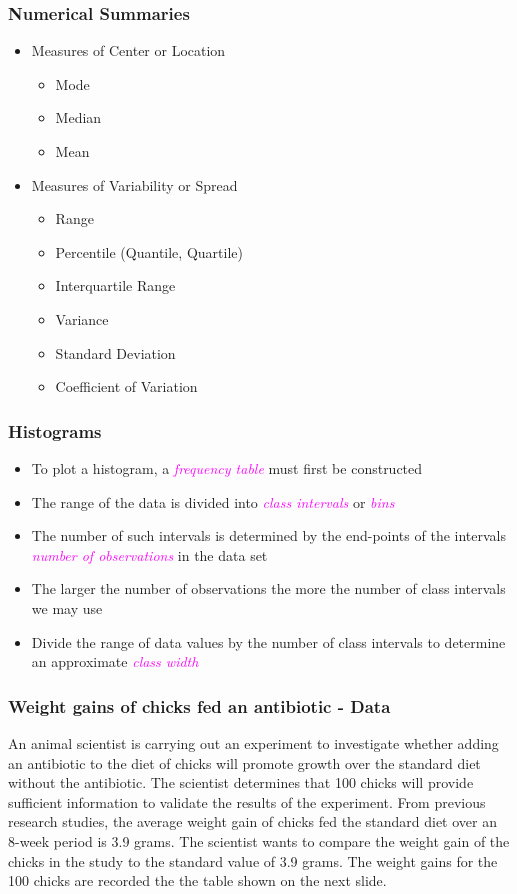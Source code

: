 \documentclass[xcolor=dvipsnames,12pt]{beamer}
\begin{document}
\begin{frame}
\frametitle{Numerical Summaries}
\begin{itemize}
\item Measures of Center or Location 
\begin{itemize}
\item Mode
\item Median
\item Mean 
\end{itemize}
\item Measures of Variability or Spread 
\begin{itemize}
\item Range 
\item Percentile (Quantile, Quartile)
\item Interquartile Range
\item Variance 
\item Standard Deviation
\item Coefficient of Variation 
\end{itemize}
\end{itemize}
\end{frame}


\begin{frame}
\frametitle{Histograms}
\begin{itemize}
\item To plot a histogram, a  \textcolor{magenta}{\textit{frequency table}} must first be
constructed 
\item The range of the data is divided into \textcolor{magenta}{\textit{class intervals}} or \textcolor{magenta}{\textit{bins}}
\item The number of such intervals  is determined by the
end-points of the intervals \textcolor{magenta}{\textit{number of observations}} in the data set
\item  The larger the number of observations the more the number of class intervals we may use
\item  Divide the range of data values by the  number of class intervals  to determine
an approximate \textcolor{magenta}{\textit{class width}}
\end{itemize}
\end{frame}

\begin{frame}
\frametitle{Weight gains of chicks fed an antibiotic - Data}
An animal scientist is carrying out an experiment to investigate whether adding an antibiotic to the diet of chicks will promote growth over the standard diet without the antibiotic. The scientist determines that 100 chicks will provide sufficient information to validate the results of the experiment. From previous research studies, the average weight gain of chicks fed the standard diet over an 8-week period is 3.9 grams. The scientist wants to compare the weight gain of the chicks in the study to the standard value of 3.9 grams. 
The weight gains for the 100 chicks are recorded the the table shown on the next slide.
\end{frame}
\end{document}
